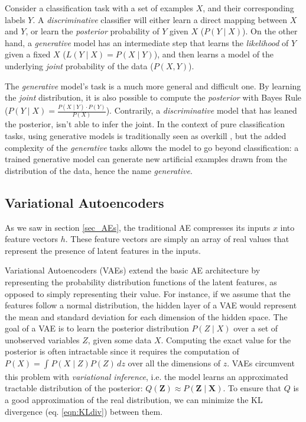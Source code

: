 \documentclass[runningheads]{llncs}
\begin{document}
Consider a classification task with a set of examples $X$, and their corresponding labels $Y$.
A \textit{discriminative} classifier will either learn a direct mapping between $X$ and $Y$, or learn the \textit{posterior} probability of $Y$ given $X$ ($P(Y \mid X)$).
On the other hand, a \textit{generative} model has an intermediate step that learns the \textit{likelihood} of $Y$ given a fixed $X$ ($L(Y \mid X) = P(X \mid Y)$), and then learns a model of the underlying \textit{joint} probability of the data ($P(X ,Y)$).

The \textit{generative} model's task is a  much more general and difficult one. By learning the \textit{joint} distribution, it is also possible to compute the \textit{posterior} with Bayes Rule ($P(Y \mid X)=\frac{P(X \mid Y) \cdot P(Y)}{P(X)}$). Contrarily, a \textit{discriminative} model that has leaned the posterior, isn't able to infer the joint.
In the context of pure classification tasks, using generative models is traditionally seen as overkill \cite{vapnik2013nature}, but the added complexity of the \textit{generative} tasks allows the model to go beyond classification: a trained generative model can generate new artificial examples drawn from the distribution of the data, hence the name \textit{generative}.

\subsection{Variational Autoencoders}
\label{sec:gen_VAE}
As we saw in section \ref{sec_AEs}, the traditional AE compresses its inputs $x$ into  feature vectors $h$. These feature vectors are simply an array of real values that represent the presence of latent features in the inputs.

Variational Autoencoders (VAEs) extend the basic AE architecture by representing the probability distribution functions of the latent features, as opposed to simply representing their value. For instance, if we assume that the features follow a normal distribution, the hidden layer of a VAE would represent the mean and standard deviation for each dimension of the hidden space. The goal of a VAE is to learn the posterior distribution \(P(Z \mid X)\) over a set of unobserved variables $Z$, given some data $X$. Computing the exact value for the posterior is often intractable since it requires the computation of \(P(X)=\int_{}^{} P(X \mid Z)P(Z) \,dz\) over all the dimensions of $z$. VAEs circumvent this problem with \textit{variational inference}, i.e. the model learns an approximated tractable distribution of the posterior: \( Q(\mathbf{Z}) \approx P(\mathbf{Z} \mid \mathbf{X})\). To ensure that $Q$ is a good approximation of the real distribution, we can minimize the KL divergence (eq. \ref{eqn:KLdiv}) between them.
\end{document}
